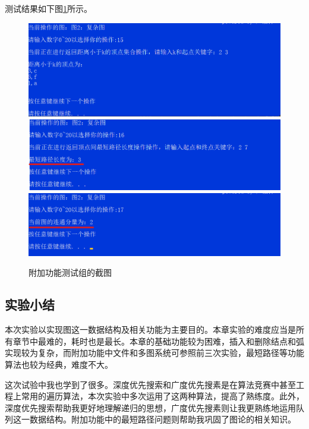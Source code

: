 \documentclass[supercite]{Experimental_Report}
\theoremstyle{definition}
\begin{document}
\begin{enumerate}
	测试结果如下图\ref{fig2-13}所示。
	\begin{figure}[htb] %
		\begin{center}
			\includegraphics[scale=0.6]{./images/图/3-15.png}
			\includegraphics[scale=0.6]{./images/图/3-16.png}
			\includegraphics[scale=0.6]{./images/图/3-17.png}
			\caption{附加功能测试组的截图}
			\label{fig2-13}
		\end{center}
	\end{figure}


\end{enumerate}

\newpage

\subsection{实验小结}

本次实验以实现图这一数据结构及相关功能为主要目的。本章实验的难度应当是所有章节中最难的，耗时也是最长。本章的基础功能较为困难，插入和删除结点和弧实现较为复杂，而附加功能中文件和多图系统可参照前三次实验，最短路径等功能算法也较为经典，难度不大。

这次试验中我也学到了很多。深度优先搜索和广度优先搜素是在算法竞赛中甚至工程上常用的遍历算法，本次实验中多次运用了这两种算法，提高了熟练度。此外，深度优先搜索帮助我更好地理解递归的思想，广度优先搜素则让我更熟练地运用队列这一数据结构。附加功能中的最短路径问题则帮助我巩固了图论的相关知识。
\end{document}

